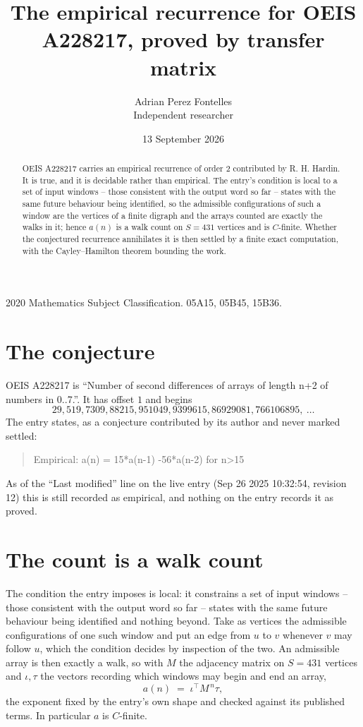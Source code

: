 \documentclass[11pt,a4paper]{article}
\title{The empirical recurrence for OEIS A228217, proved by transfer matrix}
\author{Adrian Perez Fontelles\\ \small Independent researcher}
\date{13 September 2026}
\theoremstyle{plain}
\theoremstyle{definition}
\begin{document}
\maketitle

\begin{abstract}
OEIS A228217 carries an empirical recurrence of order $2$ contributed by R. H. Hardin. It is
true, and it is decidable rather than empirical. The entry's condition is local to a set of input windows -- those consistent with the output word so far -- states with the same future behaviour being identified, so
the admissible configurations of such a window are the vertices of a finite digraph and the
arrays counted are exactly the walks in it; hence $a(n)$ is a walk count on $S=431$ vertices
and is $C$-finite. Whether the conjectured recurrence annihilates it is then settled by a
finite exact computation, with the Cayley--Hamilton theorem bounding the work.
\end{abstract}

\noindent\small 2020 Mathematics Subject Classification. 05A15, 05B45, 15B36.\normalsize

\section{The conjecture}

OEIS A228217 is ``Number of second differences of arrays of length n+2 of numbers in 0..7.''. It has offset $1$ and begins
\[
29, 519, 7309, 88215, 951049, 9399615, 86929081, 766106895,\ \dots
\]
The entry states, as a conjecture contributed by its author and never marked settled:
\begin{quote}
Empirical: a(n) = 15*a(n-1) -56*a(n-2) for n>15
\end{quote}
As of the ``Last modified'' line on the live entry (Sep 26 2025 10:32:54, revision 12) this is still
recorded as empirical, and nothing on the entry records it as proved.

\section{The count is a walk count}

The condition the entry imposes is local: it constrains a set of input windows -- those consistent with the output word so far -- states with the same future behaviour being identified and nothing beyond. Take as
vertices the admissible configurations of one such window and put an edge from $u$ to $v$
whenever $v$ may follow $u$, which the condition decides by inspection of the two. An
admissible array is then exactly a walk, so with $M$ the adjacency matrix on $S=431$ vertices
and $\iota,\tau$ the vectors recording which windows may begin and end an array,
\[
a(n)\;=\;\iota^{\!\top}M^{\,n}\tau ,
\]
the exponent fixed by the entry's own shape and checked against its published terms. In
particular $a$ is $C$-finite.
\end{document}
